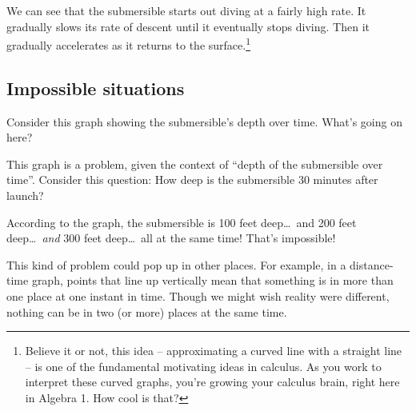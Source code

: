 We can see that the submersible starts out diving at a fairly high rate. It gradually slows its rate of descent until it eventually stops diving. Then it gradually accelerates as it returns to the surface.\footnote{Believe it or not, this idea -- approximating a curved line with a straight line -- is one of the fundamental motivating ideas in calculus. As you work to interpret these curved graphs, you're growing your calculus brain, right here in Algebra 1. How cool is that?}

\subsection{Impossible situations}

Consider this graph showing the submersible's depth over time. What's going on here?

\begin{center} %
\end{center} %

This graph is a problem, given the context of ``depth of the submersible over time''. Consider this question: How deep is the submersible 30 minutes after launch?

According to the graph, the submersible is 100 feet deep\ldots\ and 200 feet deep\ldots\ \textit{and} 300 feet deep\ldots\ all at the same time! That's impossible!

This kind of problem could pop up in other places. For example, in a distance-time graph, points that line up vertically mean that something is in more than one place at one instant in time. Though we might wish reality were different, nothing can be in two (or more) places at the same time.

